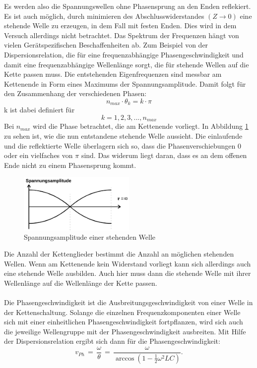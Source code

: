 \documentclass[
  bibliography=totoc,     %
  captions=tableheading,  %
  titlepage=firstiscover, %
]{scrartcl}
\begin{document}
Es werden also die Spannungswellen ohne Phasensprung an den Enden reflekiert.
Es ist auch möglich, durch minimieren des Abschlusswiderstandes $\left( Z \to 0 \right)$
eine stehende Welle zu erzeugen, in dem Fall mit festen Enden. Dies wird in dem
Versuch allerdings nicht betrachtet.
Das Spektrum der Frequenzen hängt von vielen Gerätspezifischen Beschaffenheiten
ab. Zum Beispiel von der Dispersionsrelation, die für eine frequenzabhängige
Phasengeschwindigkeit und damit eine frequenzabhängige Wellenlänge sorgt, die
für stehende Wellen auf die Kette passen muss. Die entstehenden Eigenfrequenzen
sind messbar am Kettenende in Form eines Maximums der Spannungsamplitude. Damit
folgt für den Zusammenhang der verschiedenen Phasen:
\begin{equation}
  n_{max}\cdot\theta_k=k\cdot\pi
\end{equation}
k ist dabei definiert für
\begin{equation}
  k=1,2,3,...,n_{max}
\end{equation}
Bei $n_{max}$ wird die Phase betrachtet, die am Kettenende vorliegt. In
Abbildung \ref{fig:V3567} zu sehen ist, wie die nun entstandene stehende
Welle aussieht. Die einlaufende und die reflektierte Welle überlagern sich so,
dass die Phasenverschiebungen 0 oder ein vielfaches von $\pi$ sind. Das widerum
liegt daran, dass es an dem offenen Ende nicht zu einem Phasensprung kommt.
\begin{figure}[htb]
  \centering
  \includegraphics[width=0.5\textwidth]{V3567.png}
  \caption{Spannungsamplitude einer stehenden Welle}
  \label{fig:V3567}
\end{figure}
Die Anzahl der Kettenglieder bestimmt die Anzahl an möglichen stehenden Wellen.
Wenn am Kettenende kein Widerstand vorliegt kann sich allerdings auch eine
stehende Welle ausbilden. Auch hier muss dann die stehende Welle mit ihrer
Wellenlänge auf die Wellenlänge der Kette passen. \\
\\
Die Phasengeschwindigkeit ist die Ausbreitungsgeschwindigkeit von einer Welle
in der Kettenschaltung. Solange die einzelnen Frequenzkomponenten einer Welle
sich mit einer einheitlichen Phasengeschwindigkeit fortpflanzen, wird sich auch
die jeweilige Wellengruppe mit der Phasengeschwindigkeit ausbreiten.
Mit Hilfe der Dispersionsrelation ergibt sich dann für die Phasengeschwindigkeit:
\begin{equation}
  v_{Ph}\,=\,\frac{\omega}{\theta}\,=\,\frac{\omega}{\arccos(1-\frac{1}{2}\omega^2LC)}.
  \label{eqn:phasengesch}
\end{equation}
\end{document}
